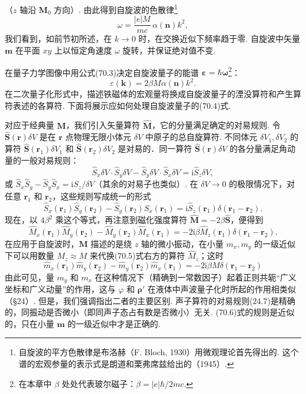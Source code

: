 （$z$ 轴沿 $\bm{M}_0$ 方向）. 由此得到自旋波的色散律\footnote{自旋波的平方色散律是布洛赫（F. Bloch, 1930）用微观理论首先得出的. 这个谱的宏观参量的表示式是朗道和栗弗席兹给出的（1945）.}
\begin{equation}
\omega=\frac{|e|M}{mc}\,\alpha(\bm{n})k^2,
\end{equation}
我们看到，如前节初所述，在 $k\to0$ 时，在交换近似下频率趋于零. 自旋波中矢量 $\bm{m}$ 在平面 $xy$ 上以恒定角速度 $\omega$ 旋转，并保证绝对值不变.

在量子力学图像中用公式(70.3)决定自旋波量子的能谱 $\bm{\varepsilon}=\hbar\bm{\omega}$\footnote{在本章中 $\beta$ 处处代表玻尔磁子：$\beta=|e|\hbar/2mc$.}：
\begin{equation}
\varepsilon(\bm{k})=2\beta M\alpha(\bm{n})k^2.
\end{equation}
在二次量子化形式中，描述铁磁体的宏观量将换成自旋波量子的湮没算符和产生算符表述的各算符. 下面将展示应如何处理自旋波量子的(70.4)式.

对应于经典量 $\bm{M}$，我们引入矢量算符 $\hat{\bm{M}}$，它的分量满足确定的对易规则. 令 $\hat{\bm{S}}(\bm{r})\delta V$ 是在 $\bm{r}$ 点物理无限小体元 $\delta V$ 中原子的总自旋算符. 不同体元 $\delta V_1,\delta V_2$ 的算符 $\hat{\bm{S}}(\bm{r}_1)\delta V_1$ 和 $\hat{\bm{S}}(\bm{r}_2)\delta V_2$ 是对易的．同一算符 $\hat{\bm{S}}(\bm{r})\delta V$ 的各分量满足角动量的一般对易规则：
\begin{equation*}
\hat{S}_x\delta V\cdot\hat{S}_y\delta V-\hat{S}_y\delta V\cdot\hat{S}_x\delta V
=\mathrm{i}\hat{S}_z\delta V,
\end{equation*}
或 $\hat{S}_x\hat{S}_y-\hat{S}_y\hat{S}_x=\mathrm{i}\hat{S}_z/\delta V$（其余的对易子也类似）. 在 $\delta V\to0$ 的极限情况下，对任意 $\bm{r}_1$ 和 $\bm{r}_2$，这些规则写成统一的形式
\begin{equation*}
\hat{S}_x(\bm{r}_1)\hat{S}_y(\bm{r}_2)-\hat{S}_y(\bm{r}_2)\hat{S}_x(\bm{r}_1)
=\mathrm{i}\hat{S}_z(\bm{r}_1)\delta(\bm{r}_1-\bm{r}_2).
\end{equation*}
现在，以 $4\beta^2$ 乘这个等式，再注意到磁化强度算符 $\hat{\bm{M}}=-2\beta\hat{\bm{S}}$，便得到
\begin{equation}
\hat{M}_x(\bm{r}_1)\hat{M}_y(\bm{r}_2)-\hat{M}_y(\bm{r}_2)\hat{M}_x(\bm{r}_1)
=-2\mathrm{i}\beta\hat{M}_z(\bm{r}_1)\delta(\bm{r}_1-\bm{r}_2).
\end{equation}
在应用于自旋波时，$\bm{M}$ 描述的是绕 $z$ 轴的微小振动，在小量 $m_x,m_y$ 的一级近似下可以用数量 $M_z\approx M$ 来代换(70.5)式右方的算符 $\hat{M}_z$；这时
\begin{equation}
\hat{m}_x(\bm{r}_1)\hat{m}_y(\bm{r}_2)-\hat{m}_y(\bm{r}_2)\hat{m}_x(\bm{r}_1)
=-2\mathrm{i}\beta M\delta(\bm{r}_1-\bm{r}_2)
\end{equation}
由此可见，量 $m_y$ 和 $m_x$ 在这种情况下（精确到一常数因子）起着正则共轭“广义坐标和广义动量”的作用，这与 $\varphi$ 和 $\bm{\rho}'$ 在液体中声波量子化时所起的作用相类似（§24）. 但是，我们强调指出二者的主要区别. 声子算符的对易规则(24.7)是精确的，同振动是否微小（即同声子态占有数是否微小）无关. (70.6)式的规则是近似的，只在小量 $\bm{m}$ 的一级近似中才是正确的.

